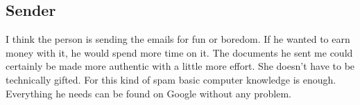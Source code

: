 \documentclass[12pt]{article}
\begin{document}
\subsection{Sender}
I think the person is sending the emails for fun or boredom. If he wanted to earn money with it, he would spend more time on it. The documents he sent me could certainly be made more authentic with a little more effort. She doesn't have to be technically gifted. For this kind of spam basic computer knowledge is enough. Everything he needs can be found on Google without any problem.


\clearpage




\end{document}
